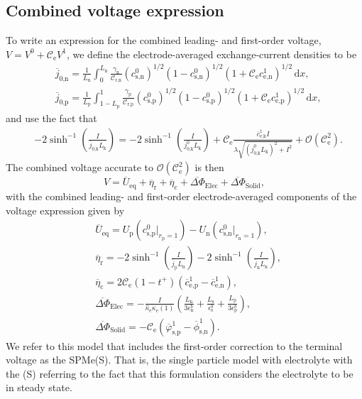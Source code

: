 \documentclass[a4paper]{article}
\newcommand{\ts}[1]{_{\text{#1}}}
\newcommand{\mybar}{\overline}
\begin{document}
\subsection{Combined voltage expression}
To write an expression for the combined leading- and first-order voltage, $V=V^0 + \mathcal{C}\ts{e} V^1$, 
we define the electrode-averaged exchange-current densities to be 
\begin{subequations}
\begin{align}
  &\mybar{j}\ts{0,n} =  \frac{1}{L\ts{n}}\int_0^{L\ts{n}} \frac{\gamma\ts{n}}{\mathcal{C}\ts{r,n}} (c\ts{s,n}^0)^{1/2}(1-c\ts{s,n}^0)^{1/2} (1+\mathcal{C}\ts{e} c\ts{e,n}^1 )^{1/2} \, \text{d}x, \\
	&\mybar{j}\ts{0,p} =  \frac{1}{L\ts{p}}\int_{1-L\ts{p}}^{1} \frac{\gamma\ts{p}}{\mathcal{C}\ts{r,p}}  (c\ts{s,p}^0)^{1/2}(1-c\ts{s,p}^0)^{1/2} (1+\mathcal{C}\ts{e} c\ts{e,p}^1 )^{1/2} \, \text{d}x,
\end{align}
\end{subequations}
and use the fact that 
\begin{align*} 
  &-2\sinh^{-1}\left(\frac{I}{\mybar{j}\ts{0,k} L\ts{k}}\right) = -2\sinh^{-1}\left(\frac{I}{j\ts{0,k}^0L\ts{k}} \right)
	+\mathcal{C}\ts{e} \frac{\mybar{c}\ts{e,k}^1 I}{\lambda\sqrt{(j\ts{$0$,k}^0L\ts{k})^2+I^2}} 
    + \mathcal{O}\left(\mathcal{C}\ts{e}^2\right).
\end{align*} 
The combined voltage accurate to $\mathcal{O}\left(\mathcal{C}\ts{e}^2\right)$ is then
\begin{equation}
  V = \mybar{U}\ts{eq} + \mybar{\eta}\ts{r}
   + \mybar{\eta}\ts{c} 
   + \mybar{\Delta\Phi}_{\text{Elec}}
   + \mybar{\Delta\Phi}_{\text{Solid}},
\end{equation}
with the combined leading- and first-order electrode-averaged components of the voltage expression given by
\begin{subequations}\label{eqn:ohms_and_overpotential}
\begin{align}
  & \mybar{U}\ts{eq} = U\ts{p}(c\ts{s,p}^0\big|_{r\ts{p}=1} )- U\ts{n}(c\ts{s,n}^0\big|_{r\ts{n}=1}),\\ 
  & \mybar{\eta}\ts{r} = -2\sinh^{-1}\left(\frac{I}{\mybar{j}\ts{p} L\ts{n}}\right)
	 -2\sinh^{-1}\left(\frac{I}{\mybar{j}\ts{n} L\ts{n}}\right), \\
	& \mybar{\eta}\ts{c} =  2 \mathcal{C}\ts{e} (1-t^+)\left(\mybar{c}\ts{e,p}^1 - \mybar{c}\ts{e,n}^1\right), \\
	&\mybar{\Delta \Phi}_{\text{Elec}}= -\frac{I}{\hat{\kappa}\ts{e} \kappa\ts{e}(1)}\left(\frac{L\ts{n}}{3\epsilon\ts{n}^b} + \frac{L\ts{s}}{\epsilon\ts{s}^b} + \frac{L\ts{p}}{3\epsilon\ts{p}^b} \right), \\
    &\mybar{\Delta \Phi}_{\text{Solid}} = -\mathcal{C}\ts{e}(\mybar{\varphi}\ts{s,p}^1 - \mybar{\phi}\ts{s,n}^1).
\end{align}
\end{subequations}
We refer to this model that includes the first-order correction to the terminal voltage as the SPMe(S). That is, the single particle model with electrolyte with the (S) referring to the fact that this formulation considers the electrolyte to be in steady state. 
\end{document}
